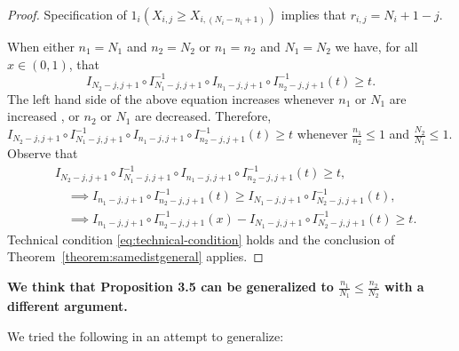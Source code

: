 \documentclass[12pt]{article}
\begin{document}
\begin{proof}


Specification of $1_i(X_{i,j} \geq X_{i,(N_i - n_i + 1)})$ implies that $r_{i,j} = N_i + 1 - j$. 
\vspace{12pt}

When either $n_1 = N_1$ and $n_2 = N_2$ or $n_1 = n_2$ and $N_1 = N_2$ we have, for all $x \in (0,1)$, that
$$
  I_{N_2-j,j+1} \circ I_{N_1-j,j+1}^{-1} \circ I_{n_1-j,j+1} \circ I_{n_2-j,j+1}^{-1} (t) \geq t.
$$
The left hand side of the above equation increases whenever $n_1$ or $N_1$ are increased \citep{askitis2021logarithmic}, or $n_2$ or $N_1$ are decreased. Therefore, 
$
  I_{N_2-j,j+1} \circ I_{N_1-j,j+1}^{-1} \circ I_{n_1-j,j+1} \circ I_{n_2-j,j+1}^{-1} (t) \geq t
$
whenever $\frac{n_1}{n_2}\leq 1$ and $\frac{N_2}{N_1} \leq 1$. Observe that
\begin{align*}
&I_{N_2-j,j+1} \circ I_{N_1-j,j+1}^{-1} \circ I_{n_1-j,j+1} \circ I_{n_2-j,j+1}^{-1} (t) \geq t, \\ 
&\quad\implies I_{n_1-j,j+1} \circ I_{n_2-j,j+1}^{-1} (t) \geq I_{N_1-j,j+1} \circ I_{N_2-j,j+1}^{-1}(t),   \\
&\quad\implies I_{n_1-j,j+1} \circ I_{n_2-j,j+1}^{-1} (x) - I_{N_1-j,j+1} \circ I_{N_2-j,j+1}^{-1}(t) \geq t.
\end{align*}
Technical condition \eqref{eq:technical-condition} holds and the conclusion of Theorem~\ref{theorem:samedistgeneral} applies.
\end{proof}



\vspace{12pt}

\textbf{We think that Proposition 3.5 can be generalized to $\frac{n_1}{N_1} \leq \frac{n_2}{N_2}$ with a different argument.}

\vspace{12pt}

We tried the following in an attempt to generalize: \\
\end{document}

